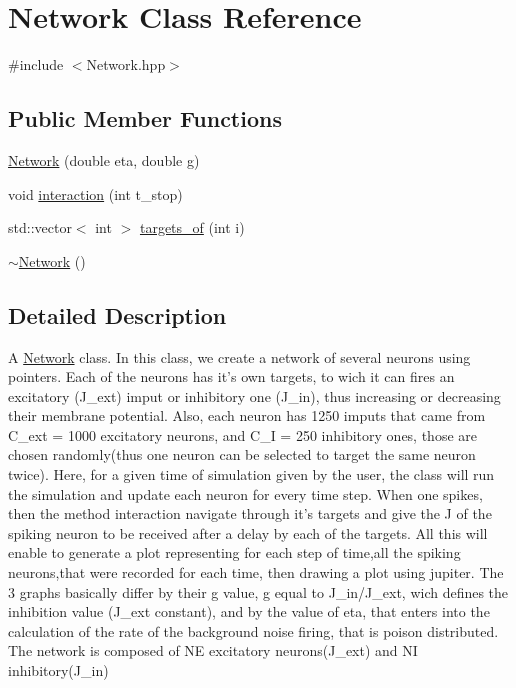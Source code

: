 \hypertarget{classNetwork}{\section{Network Class Reference}
\label{classNetwork}
}


{\ttfamily \#include $<$Network.\-hpp$>$}

\subsection*{Public Member Functions}
\begin{DoxyCompactItemize}
\item 
\hyperlink{classNetwork_a2316eb368da9bc4d33701de5617e7f0b}{Network} (double eta, double g)
\item 
void \hyperlink{classNetwork_a80a0df9ab1daa646388fe0f1457e964c}{interaction} (int t\-\_\-stop)
\item 
std\-::vector$<$ int $>$ \hyperlink{classNetwork_ac9d756463498db8a93c8ca23855029e6}{targets\-\_\-of} (int i)
\item 
\hyperlink{classNetwork_a7a4e19cdb4bf0c7ecf82baa643831492}{$\sim$\-Network} ()
\end{DoxyCompactItemize}


\subsection{Detailed Description}
A \hyperlink{classNetwork}{Network} class. In this class, we create a network of several neurons using pointers. Each of the neurons has it's own targets, to wich it can fires an excitatory (J\-\_\-ext) imput or inhibitory one (J\-\_\-in), thus increasing or decreasing their membrane potential. Also, each neuron has 1250 imputs that came from C\-\_\-ext = 1000 excitatory neurons, and C\-\_\-\-I = 250 inhibitory ones, those are chosen randomly(thus one neuron can be selected to target the same neuron twice). Here, for a given time of simulation given by the user, the class will run the simulation and update each neuron for every time step. When one spikes, then the method interaction navigate through it's targets and give the J of the spiking neuron to be received after a delay by each of the targets. All this will enable to generate a plot representing for each step of time,all the spiking neurons,that were recorded for each time, then drawing a plot using jupiter. The 3 graphs basically differ by their g value, g equal to J\-\_\-in/\-J\-\_\-ext, wich defines the inhibition value (J\-\_\-ext constant), and by the value of eta, that enters into the calculation of the rate of the background noise firing, that is poison distributed. The network is composed of N\-E excitatory neurons(\-J\-\_\-ext) and N\-I inhibitory(\-J\-\_\-in) 

